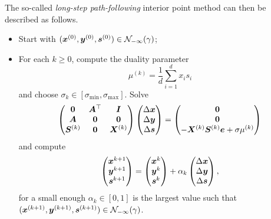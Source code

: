 The so-called {\em long-step path-following} interior point method can then be described as follows.
\begin{itemize}
 \item Start with $(\bm{x}^{(0)},\bm{y}^{(0)},\bm{s}^{(0)})\in \mathcal{N}_{-\infty}(\gamma)$;
 \item For each $k\geq 0$, compute the duality parameter
 \begin{equation*}
  \mu^{(k)} = \frac{1}{d} \sum_{i=1}^d x_is_i
 \end{equation*}
and choose $\sigma_k\in [\sigma_{\mathrm{min}},\sigma_{\mathrm{max}}]$. Solve
\begin{equation*}
 \begin{pmatrix}
  \bm{0} & \bm{A}^{\top} & \bm{I} \\
  \bm{A} & \bm{0} & \bm{0} \\
  \bm{S}^{(k)} & \bm{0} & \bm{X}^{(k)}
 \end{pmatrix}
\begin{pmatrix} \Delta\bm{x}\\ \Delta \bm{y}\\ \Delta\bm{s} \end{pmatrix} = \begin{pmatrix} \bm{0} \\ \bm{0} \\ -\bm{X}^{(k)}\bm{S}^{(k)}\bm{e}+\sigma \mu^{(k)}\end{pmatrix}
\end{equation*}
and compute
\begin{equation*}
\begin{pmatrix} \bm{x}^{k+1}\\ \bm{y}^{k+1}\\ \bm{s}^{k+1}\end{pmatrix}= \begin{pmatrix} \bm{x}^{k}\\ \bm{y}^{k}\\ \bm{s}^{k}\end{pmatrix} +\alpha_k \begin{pmatrix} \Delta\bm{x}\\ \Delta \bm{y}\\ \Delta\bm{s} \end{pmatrix},
 \end{equation*}
for a small enough $\alpha_k\in [0,1]$ is the largest value such that $(\bm{x}^{(k+1)},\bm{y}^{(k+1)},\bm{s}^{(k+1)})\in \mathcal{N}_{-\infty}(\gamma)$.
\end{itemize}


